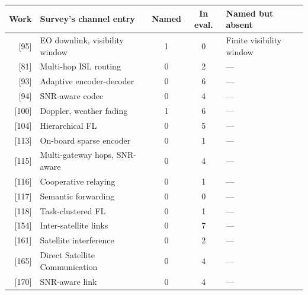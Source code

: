 \begin{tabular}{rlccl}
\toprule
Work & Survey's channel entry & Named & In eval. & Named but absent \\
\midrule
{[95]} & EO downlink, visibility window & 1 & 0 & Finite visibility window \\
{[81]} & Multi-hop ISL routing & 0 & 2 & --- \\
{[93]} & Adaptive encoder-decoder & 0 & 6 & --- \\
{[94]} & SNR-aware codec & 0 & 4 & --- \\
{[100]} & Doppler, weather fading & 1 & 6 & --- \\
{[104]} & Hierarchical FL & 0 & 5 & --- \\
{[113]} & On-board sparse encoder & 0 & 1 & --- \\
{[115]} & Multi-gateway hops, SNR-aware & 0 & 4 & --- \\
{[116]} & Cooperative relaying & 0 & 1 & --- \\
{[117]} & Semantic forwarding & 0 & 0 & --- \\
{[118]} & Task-clustered FL & 0 & 1 & --- \\
{[154]} & Inter-satellite links & 0 & 7 & --- \\
{[161]} & Satellite interference & 0 & 2 & --- \\
{[165]} & Direct Satellite Communication & 0 & 4 & --- \\
{[170]} & SNR-aware link & 0 & 4 & --- \\
\bottomrule
\end{tabular}
